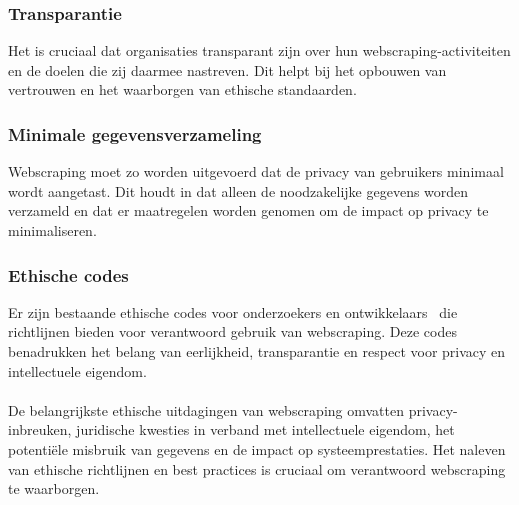 \subsubsection{Transparantie}
Het is cruciaal dat organisaties transparant zijn over hun webscraping-activiteiten en de doelen die zij daarmee nastreven. Dit helpt bij het opbouwen van vertrouwen en het waarborgen van ethische standaarden.

\subsubsection{Minimale gegevensverzameling}
Webscraping moet zo worden uitgevoerd dat de privacy van gebruikers minimaal wordt aangetast. Dit houdt in dat alleen de noodzakelijke gegevens worden verzameld en dat er maatregelen worden genomen om de impact op privacy te minimaliseren.

\subsubsection{Ethische codes}
Er zijn bestaande ethische codes voor onderzoekers en ontwikkelaars~\autocite{Don2018} die richtlijnen bieden voor verantwoord gebruik van webscraping. Deze codes benadrukken het belang van eerlijkheid, transparantie en respect voor privacy en intellectuele eigendom.
\\
\\
De belangrijkste ethische uitdagingen van webscraping omvatten privacy-inbreuken, juridische kwesties in verband met intellectuele eigendom, het potentiële misbruik van gegevens en de impact op systeemprestaties. Het naleven van ethische richtlijnen en best practices is cruciaal om verantwoord webscraping te waarborgen.